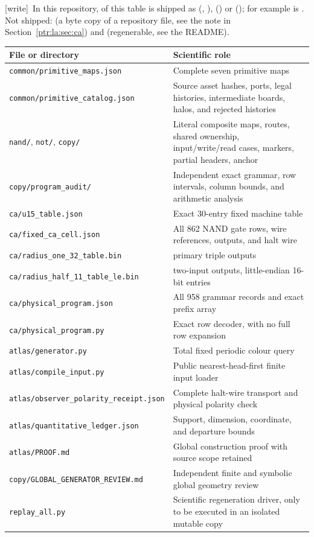 \documentclass[11pt,letterpaper]{article}
\theoremstyle{definition}\newtheorem{definition}[theorem]{Definition}
\theoremstyle{remark}\newtheorem{remark}[theorem]{Remark}
\newcommand{\codeu}[1]{\nolinkurl{#1}}
\newcommand{\wtag}{\textup{[write]}}
\begin{document}
{\small\wtag\ In this repository,  of this table is shipped as
 (,
),  ()
or  (); for example
 is
. Not
shipped:  (a byte copy of a repository file, see the
note in Section~\ref{ptr:la:sec:ca}) and 
(regenerable, see the README).\par}
\begin{longtable}{@{}>{\raggedright\arraybackslash}p{}>{\raggedright\arraybackslash}p{}@{}}
\toprule
File or directory & Scientific role\\\midrule\endhead
\codeu{common/primitive_maps.json} & Complete seven primitive maps\\[3pt]
\codeu{common/primitive_catalog.json} & Source asset hashes, ports, legal histories, intermediate boards, halos, and rejected histories\\[3pt]
\codeu{nand/}, \codeu{not/}, \codeu{copy/} & Literal composite maps, routes, shared ownership, input/write/read cases, markers, partial headers, anchor\\[3pt]
\codeu{copy/program_audit/} & Independent exact grammar, row intervals, column bounds, and arithmetic analysis\\[3pt]
\codeu{ca/u15_table.json} & Exact 30-entry fixed machine table\\[3pt]
\codeu{ca/fixed_ca_cell.json} & All 862 NAND gate rows, wire references, outputs, and halt wire\\[3pt]
\codeu{ca/radius_one_32_table.bin} & 32768 primary triple outputs\\[3pt]
\codeu{ca/radius_half_11_table_le.bin} & 4194304 two-input outputs, little-endian 16-bit entries\\[3pt]
\codeu{ca/physical_program.json} & All 958 grammar records and exact prefix array\\[3pt]
\codeu{ca/physical_program.py} & Exact row decoder, with no full row expansion\\[3pt]
\codeu{atlas/generator.py} & Total fixed periodic colour query\\[3pt]
\codeu{atlas/compile_input.py} & Public nearest-head-first finite input loader\\[3pt]
\codeu{atlas/}\newline\codeu{observer_polarity_receipt.json} & Complete halt-wire transport and physical polarity check\\[3pt]
\codeu{atlas/quantitative_ledger.json} & Support, dimension, coordinate, and departure bounds\\[3pt]
\codeu{atlas/PROOF.md} & Global construction proof with source scope retained\\[3pt]
\codeu{copy/GLOBAL_GENERATOR_REVIEW.md} & Independent finite and symbolic global geometry review\\[3pt]
\codeu{replay_all.py} & Scientific regeneration driver, only to be executed in an isolated mutable copy\\\bottomrule
\end{longtable}
\end{document}
